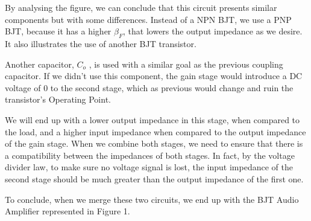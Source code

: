 By analysing the figure, we can conclude that this circuit presents similar components but with some differences.
Instead of a NPN BJT, we use a PNP BJT, because it has a higher $\beta_F$, that lowers the
output impedance as we desire. It also illustrates the use of another BJT transistor. \par
Another capacitor, $C_o$ , is used with a similar goal as the previous coupling capacitor. If we
didn’t use this component, the gain stage would introduce a DC voltage of 0 to the second stage,
which as previous would change and ruin the transistor’s Operating Point. \par
We will end up with a lower output impedance in this stage, when compared to
the load, and a higher input impedance when compared to the output impedance of the gain
stage. When we combine both stages, we need to ensure that there is a compatibility between the
impedances of both stages. In fact, by the voltage divider law, to make sure no voltage signal is lost, the input
impedance of the second stage should be much greater than the output impedance of the first
one.\par
To conclude, when we merge these two circuits, we end up with the BJT Audio Amplifier represented in Figure 1.

%

%

